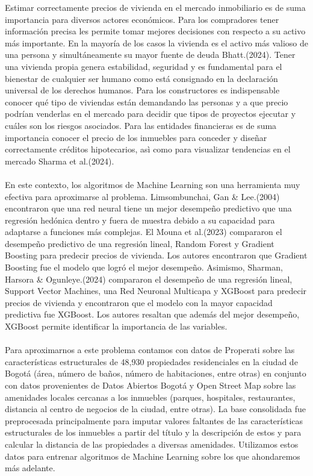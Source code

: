 \documentclass[article,11 pt]{article}
\begin{document}
Estimar correctamente precios de vivienda en el mercado inmobiliario es de suma importancia para diversos actores económicos. Para los compradores tener información precisa les permite tomar mejores decisiones con respecto a su activo más importante. En la mayoría de los casos la vivienda es el activo más valioso de una persona y simultáneamente su mayor fuente de deuda Bhatt.(2024). Tener una vivienda propia genera estabilidad, seguridad y es fundamental para el bienestar de cualquier ser humano como está consignado en la declaración universal de los derechos humanos. Para los constructores es indispensable conocer qué tipo de viviendas están demandando las personas y a que precio podrían venderlas en el mercado para decidir que tipos de proyectos ejecutar y cuáles son los riesgos asociados. Para las entidades financieras es de suma importancia conocer el precio de los inmuebles para conceder y diseñar correctamente créditos hipotecarios, asì como para visualizar tendencias en el mercado Sharma et al.(2024). 
\\
\\
En este contexto, los algoritmos de Machine Learning son una herramienta muy efectiva para aproximarse al problema.  Limsombunchai, Gan & Lee.(2004) encontraron que una red neural tiene un mejor desempeño predictivo que una regresión hedónica dentro y fuera de muestra debido a su capacidad para adaptarse a funciones más complejas. El Mouna et al.(2023) compararon el desempeño predictivo de una regresión lineal, Random Forest y Gradient Boosting para predecir precios de vivienda. Los autores encontraron que Gradient Boosting fue el modelo que logró el mejor desempeño. Asimismo, Sharman, Harsora & Ogunleye.(2024) compararon el desempeño de una regresión lineal, Support Vector Machines, una Red Neuronal Multicapa y XGBoost para predecir precios de vivienda y encontraron que el modelo con la mayor capacidad predictiva fue XGBoost. Los autores resaltan que además del mejor desempeño, XGBoost permite identificar la importancia de las variables. 
\\
\\
Para aproximarnos a este problema contamos con datos de Properati sobre las características estructurales de 48,930 propiedades residenciales en la ciudad de Bogotá (área, número de baños, número de habitaciones, entre otras) en conjunto con datos provenientes de Datos Abiertos Bogotá y Open Street Map sobre las amenidades locales cercanas a los inmuebles (parques, hospitales, restaurantes, distancia al centro de negocios de la ciudad, entre otras). La base consolidada fue preprocesada principalmente para imputar valores faltantes de las características estructurales de los inmuebles a partir del título y la descripción de estos y para calcular la distancia de las propiedades a diversas amenidades. Utilizamos estos datos para entrenar algoritmos de Machine Learning sobre los que ahondaremos más adelante. 
\end{document}
